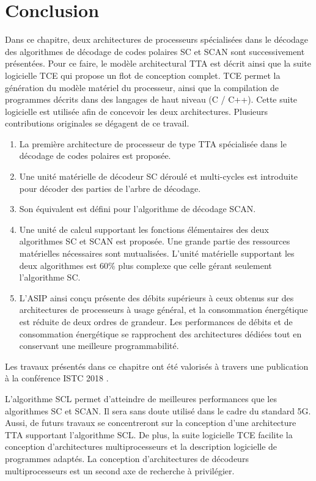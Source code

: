 \section*{Conclusion}


Dans ce chapitre, deux architectures de processeurs spécialisées dans le décodage des algorithmes de décodage de codes polaires SC et SCAN sont successivement présentées. Pour ce faire, le modèle architectural TTA est décrit ainsi que la suite logicielle TCE qui propose un flot de conception complet. TCE permet la génération du modèle matériel du processeur, ainsi que la compilation de programmes décrits dans des langages de haut niveau (C / C++). Cette suite logicielle est utilisée afin de concevoir les deux architectures. Plusieurs contributions originales se dégagent de ce travail.

\begin{enumerate}[label=(\roman*)]
  \item La première architecture de processeur de type TTA spécialisée dans le décodage de codes polaires est proposée.
  \item Une unité matérielle de décodeur SC déroulé et multi-cycles est introduite pour décoder des parties de l'arbre de décodage.
  \item Son équivalent est défini pour l'algorithme de décodage SCAN.
  \item Une unité de calcul supportant les fonctions élémentaires des deux algorithmes SC et SCAN est proposée. Une grande partie des ressources matérielles nécessaires sont mutualisées. L'unité matérielle supportant les deux algorithmes est 60\% plus complexe que celle gérant seulement l'algorithme SC.
  \item L'ASIP ainsi conçu présente des débits supérieurs à ceux obtenus sur des architectures de processeurs à usage général, et la consommation énergétique est réduite de deux ordres de grandeur. Les performances de débits et de consommation énergétique se rapprochent des architectures dédiées tout en conservant une meilleure programmabilité.
\end{enumerate}

Les travaux présentés dans ce chapitre ont été valorisés à travers une publication à la conférence ISTC 2018 .

L'algorithme SCL permet d'atteindre de meilleures performances que les algorithmes SC et SCAN. Il sera sans doute utilisé dans le cadre du standard 5G. Aussi, de futurs travaux se concentreront sur la conception d'une architecture TTA supportant l'algorithme SCL. De plus, la suite logicielle TCE facilite la conception d'architectures multiprocesseurs et la description logicielle de programmes adaptés. La conception d'architectures de décodeurs multiprocesseurs est un second axe de recherche à privilégier.



